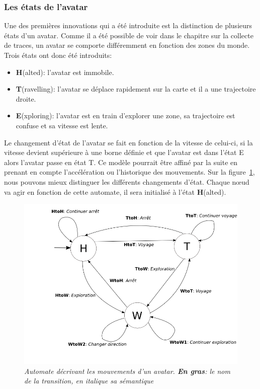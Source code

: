 	\subsubsection{Les états de l'avatar}
	\label{Automate}
	Une des premières innovations qui a été introduite est la distinction de plusieurs états d'un avatar. Comme il a été possible de voir dans le chapitre sur la collecte de traces, un avatar se comporte différemment en fonction des zones du monde. Trois états ont donc été introduits:
	\begin{itemize}
	\renewcommand{\labelitemi}{$\bullet$}
		\item \textbf{H}(alted): l'avatar est immobile.
		\item \textbf{T}(ravelling): l'avatar se déplace rapidement sur la carte et il a une trajectoire droite.  
		\item \textbf{E}(xploring): l'avatar est en train d'explorer une zone, sa trajectoire est confuse et sa vitesse est lente.
	\end{itemize} 
	Le changement d'état de l'avatar se fait en fonction de la vitesse de celui-ci, si la vitesse devient supérieure à une borne définie et que l'avatar est dans l'état E alors l'avatar passe en état T. Ce modèle pourrait être affiné par la suite en prenant en compte l'accélération ou l'historique des mouvements. Sur la figure~\ref{automateMob}, nous pouvons mieux distinguer les différents changements d'état. Chaque nœud va agir en fonction de cette automate, il sera initialisé à l'état \textbf{H}(alted). \\
	

	\begin{figure}[!h]
        \centering
        \includegraphics[scale=0.4]{./Ressources/Images/automate.png}
        \caption{\textit{\small Automate décrivant les mouvements d'un avatar. \textbf{En gras}: le nom de la transition, en \textit{italique} sa sémantique}}
        \label{automateMob}
        \end{figure}

